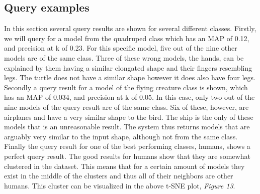 \documentclass{bigdata}
\begin{document}
\subsection{Query examples}
In this section several query results are shown for several different classes. Firstly, we will query for a model from the quadruped class which has an MAP of 0.12, and precision at k of 0.23. For this specific model, five out of the nine other models are of the same class. Three of these wrong models, the hands, can be explained by them having a similar elongated shape and their fingers resembling legs. The turtle does not have a similar shape however it does also have four legs.  \\
Secondly a query result for a model of the flying creature class is shown, which has an MAP of 0.034, and precision at k of 0.05. In this case, only two out of the nine models of the query result are of the same class. Six of these, however, are airplanes and have a very similar shape to the bird. The ship is the only of these models that is an unreasonable result. The system thus returns models that are arguably very similar to the input shape, although not from the same class. \\
Finally the query result for one of the best performing classes, humans, shows a perfect query result. The good results for humans show that they are somewhat clustered in the dataset. This means that for a certain amount of models they exist in the middle of the clusters and thus all of their neighbors are other humans. This cluster can be visualized in the above t-SNE plot, \textit{Figure 13}. \\
\end{document}
